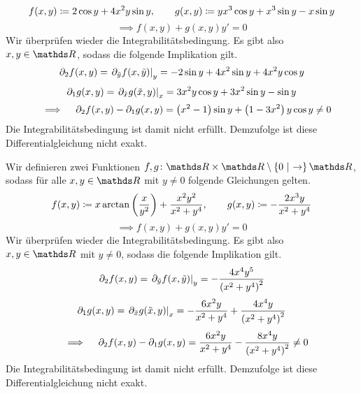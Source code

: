 \begin{atiSolution}
\begin{atiSubtaskSolutions}
{\begin{atiSubtaskSolutions}
{          \[
            f(x,y) \coloneqq 2\cos y + 4x^2y\sin y ,\qquad g(x,y) \coloneqq yx^3\cos y + x^3\sin y - x\sin y
          \]
          \[
            \implies f(x,y) + g(x,y)y' = 0
          \]
          Wir überprüfen wieder die Integrabilitätsbedingung.
          Es gibt also $x,y\in\setR$, sodass die folgende Implikation gilt.
          \[
            \partial_2f(x,y) = \left.\partial_{\tilde{y}} f(x,\tilde{y})\right\vert_{y}^{} = -2\sin y + 4x^2\sin y + 4x^2y\cos y
          \]
          \[
            \partial_1g(x,y) = \left.\partial_{\tilde{x}} g(\tilde{x},y)\right\vert_{x}^{} = 3x^2y\cos y + 3x^2\sin y - \sin y
          \]
          \[
            \implies \partial_2f(x,y) - \partial_1g(x,y) = \curvb{x^2-1}\sin y + \curvb{1-3x^2}y\cos y \neq 0
          \]
          Die Integrabilitätsbedingung ist damit nicht erfüllt.
          Demzufolge ist diese Differentialgleichung nicht exakt.
        }
        \item[\localref{bii}]{
          Wir definieren zwei Funktionen $\func{f,g}{\setR\times\setR\setminus\set{0}}{\setR}$, sodass für alle $x,y\in\setR$ mit $y\neq 0$ folgende Gleichungen gelten.
          \[
            f(x,y) \coloneqq x\arctan\left( \frac{x}{y^2} \right) + \frac{x^2y^2}{x^2+y^4} ,\qquad g(x,y) \coloneqq -\frac{2x^3y}{x^2+y^4}
          \]
          \[
            \implies f(x,y) + g(x,y)y' = 0
          \]
          Wir überprüfen wieder die Integrabilitätsbedingung.
          Es gibt also $x,y\in\setR$ mit $y\neq 0$, sodass die folgende Implikation gilt.
          \[
            \partial_2f(x,y) = \left.\partial_{\tilde{y}} f(x,\tilde{y})\right\vert_{y}^{} = -\frac{4x^4y^5}{\left( x^2+y^4 \right)^2}
          \]
          \[
            \partial_1g(x,y) = \left.\partial_{\tilde{x}} g(\tilde{x},y)\right\vert_{x}^{} = -\frac{6x^2y}{x^2+y^4} + \frac{4x^4y}{\left( x^2+y^4 \right)^2}
          \]
          \[
            \implies \partial_2f(x,y) - \partial_1g(x,y) = \frac{6x^2y}{x^2+y^4} - \frac{8x^4y}{\curvb{x^2+y^4}^2} \neq 0
          \]
          Die Integrabilitätsbedingung ist damit nicht erfüllt.
          Demzufolge ist diese Differentialgleichung nicht exakt.
        }
      \end{atiSubtaskSolutions}
    }
  \end{atiSubtaskSolutions}
\end{atiSolution}